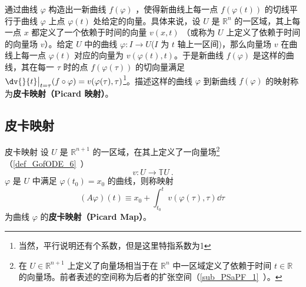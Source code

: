 
\begin{issues}
\issueDraft
\end{issues}

通过曲线 $\varphi$ 构造出一新曲线 $f(\varphi)$ ，使得新曲线上每一点 $f(\varphi(t))$ 的切线平行于曲线 $\varphi$ 上点 $\varphi(t)$ 处给定的向量。具体来说，设 $U$ 是 $\mathbb R^n$ 的一区域，其上每一点 $x$ 都定义了一个依赖于时间的向量 $v(x,t)$ （或称为 $U$ 上定义了依赖于时间的向量场 $v$）。给定 $U$ 中的曲线 $\varphi:I\rightarrow U$($I$ 为 $t$ 轴上一区间)，那么向量场 $v$ 在曲线上每一点 $\varphi(t)$ 对应的向量为 $v(\varphi(t),t)$。于是新曲线 $f(\varphi)$ 是这样的曲线，其在每一 $\tau$ 时的点 $f(\varphi(\tau))$ 的切向量满足 $\dv{}{t}\big|_{t=\tau}(f\circ \varphi)=v(\varphi(\tau),\tau)$\footnote{当然，平行说明还有个系数，但是这里特指系数为1}。描述这样的曲线 $\varphi$ 到新曲线 $f(\varphi)$ 的映射称为\textbf{皮卡映射（Picard 映射）}。
\subsection{皮卡映射}
\begin{definition}{皮卡映射}\label{def_PicMap_1}
设 $U$ 是 $\mathbb R^{n+1}$ 的一区域，在其上定义了一向量场\footnote{在 $U\in\mathbb R^{n+1}$ 上定义了向量场相当于在 $\mathbb R^n$ 中一区域定义了依赖于时间 $t\in\mathbb R$ 的向量场。前者表述的空间称为后者的扩张空间（\autoref{sub_PSaPF_1}~）。}（\autoref{def_GofODE_6}~） 
\begin{equation}
v:U\rightarrow\mathbb TU~.
\end{equation}
$\varphi$ 是 $U$ 中满足 $\varphi(t_0)=x_0$ 的曲线，则称映射
\begin{equation}\label{eq_PicMap_1}
(A\varphi)(t)\equiv x_0+\int_{t_0}^{t}v(\varphi(\tau),\tau)\dd \tau~
\end{equation}
为曲线 $\varphi$ 的\textbf{皮卡映射（Picard Map）}。
\end{definition}

